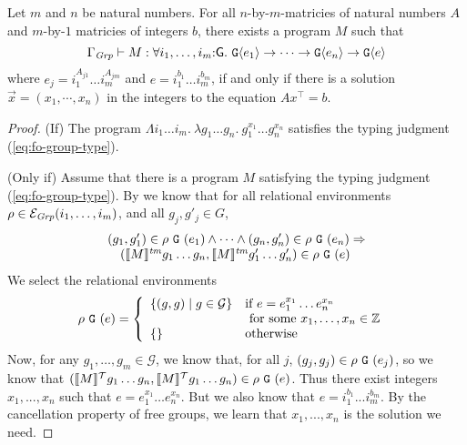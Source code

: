 \begin{theorem}
  Let $m$ and $n$ be natural numbers. For all $n$-by-$m$-matricies of
  natural numbers $A$ and $m$-by-$1$ matricies of integers $b$,
  there exists a program $M$ such that
  \begin{equation}
    \label{eq:fo-group-type}
    \Gamma_\Grp \vdash M : \forall i_1,\dots,i_m\mathord:\mathsf{G}.\ \tyPrim{G}{e_1} \to \dots \to \tyPrim{G}{e_n} \to \tyPrim{G}{e}
  \end{equation}
  where $e_j = i_1^{A_{j1}}\dots i_m^{A_{jm}}$ and $e = i_1^{b_1}\dots
  i_m^{b_m}$, if and only if there is a solution $\vec{x} =
  (x_1,\cdots,x_n)$ in the integers to the equation $A x^\top = b$.
\end{theorem}


\begin{proof}
  (If) The program $\Lambda i_1\dots i_m.\ \lambda g_1\dots g_n.\
  g_1^{x_1}\dots g_n^{x_n}$ satisfies the typing judgment
  (\ref{eq:fo-group-type}).

  (Only if) Assume that there is a program $M$ satisfying the typing
  judgment (\ref{eq:fo-group-type}). By \thmref{thm:abstraction} we
  know that for all relational environments $\rho \in
  \mathcal{E}_{\mathit{Grp}}(i_1,\dots,i_m)$, and all $g_j,g'_j \in G$,
  \begin{displaymath}
    \begin{array}{l}
      (g_1,g'_1) \in \rho\ \tyPrimNm{G}\ (e_1) \land \dots \land (g_n,g'_n) \in \rho\ \tyPrimNm{G}\ (e_n) \Rightarrow \\
      \quad (\tmSem{M}g_1\dots g_n, \tmSem{M}g'_1\dots g'_n) \in \rho\ \tyPrimNm{G}\ (e)
    \end{array}
  \end{displaymath}
  We select the relational environments
  \begin{displaymath}
    \rho\ \tyPrimNm{G}\ (e) = \left\{
      \begin{array}{ll}
        \{(g,g) \sepbar g \in \mathcal{G} \} &
        \begin{array}[t]{@{}l}
          \textrm{if}\ e = e_1^{x_1}\dots e_n^{x_n} \\
          \textrm{ for some }x_1,\dots,x_n \in \mathbb{Z}
        \end{array}
        \\
        \{\} & \textrm{otherwise}
      \end{array}
    \right.
  \end{displaymath}
  Now, for any $g_1,\dots,g_m \in \mathcal{G}$, we know that, for all
  $j$, $(g_j,g_j) \in \rho\ \tyPrimNm{G}\ (e_j)$, so we know that
  $(\llbracket M \rrbracket^{\mathcal{T}}g_1\dots g_n, \llbracket M \rrbracket^{\mathcal{T}}g_1 \dots g_n) \in \rho\
  \textup{\texttt{G}}\ (e)$. Thus there exist integers $x_1,...,x_n$ such
  that $e = e_1^{x_1}\dots e_n^{x_n}$. But we also know that $e =
  i_1^{b_1}...i_m^{b_m}$. By the cancellation property of free groups,
  we learn that $x_1,...,x_n$ is the solution we need.
\end{proof}

